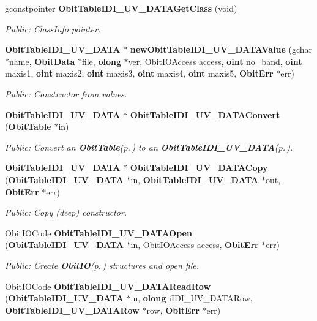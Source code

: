 \begin{CompactItemize}
gconstpointer {\bf Obit\-Table\-IDI\_\-UV\_\-DATAGet\-Class} (void)
\begin{CompactList}\small\item\em Public: Class\-Info pointer. \item\end{CompactList}\item 
{\bf Obit\-Table\-IDI\_\-UV\_\-DATA} $\ast$ {\bf new\-Obit\-Table\-IDI\_\-UV\_\-DATAValue} (gchar $\ast$name, {\bf Obit\-Data} $\ast$file, {\bf olong} $\ast$ver, Obit\-IOAccess access, {\bf oint} no\_\-band, {\bf oint} maxis1, {\bf oint} maxis2, {\bf oint} maxis3, {\bf oint} maxis4, {\bf oint} maxis5, {\bf Obit\-Err} $\ast$err)
\begin{CompactList}\small\item\em Public: Constructor from values. \item\end{CompactList}\item 
{\bf Obit\-Table\-IDI\_\-UV\_\-DATA} $\ast$ {\bf Obit\-Table\-IDI\_\-UV\_\-DATAConvert} ({\bf Obit\-Table} $\ast$in)
\begin{CompactList}\small\item\em Public: Convert an {\bf Obit\-Table}{\rm (p.\,\pageref{structObitTable})} to an {\bf Obit\-Table\-IDI\_\-UV\_\-DATA}{\rm (p.\,\pageref{structObitTableIDI__UV__DATA})}. \item\end{CompactList}\item 
{\bf Obit\-Table\-IDI\_\-UV\_\-DATA} $\ast$ {\bf Obit\-Table\-IDI\_\-UV\_\-DATACopy} ({\bf Obit\-Table\-IDI\_\-UV\_\-DATA} $\ast$in, {\bf Obit\-Table\-IDI\_\-UV\_\-DATA} $\ast$out, {\bf Obit\-Err} $\ast$err)
\begin{CompactList}\small\item\em Public: Copy (deep) constructor. \item\end{CompactList}\item 
Obit\-IOCode {\bf Obit\-Table\-IDI\_\-UV\_\-DATAOpen} ({\bf Obit\-Table\-IDI\_\-UV\_\-DATA} $\ast$in, Obit\-IOAccess access, {\bf Obit\-Err} $\ast$err)
\begin{CompactList}\small\item\em Public: Create {\bf Obit\-IO}{\rm (p.\,\pageref{structObitIO})} structures and open file. \item\end{CompactList}\item 
Obit\-IOCode {\bf Obit\-Table\-IDI\_\-UV\_\-DATARead\-Row} ({\bf Obit\-Table\-IDI\_\-UV\_\-DATA} $\ast$in, {\bf olong} i\-IDI\_\-UV\_\-DATARow, {\bf Obit\-Table\-IDI\_\-UV\_\-DATARow} $\ast$row, {\bf Obit\-Err} $\ast$err)

\end{CompactItemize}
